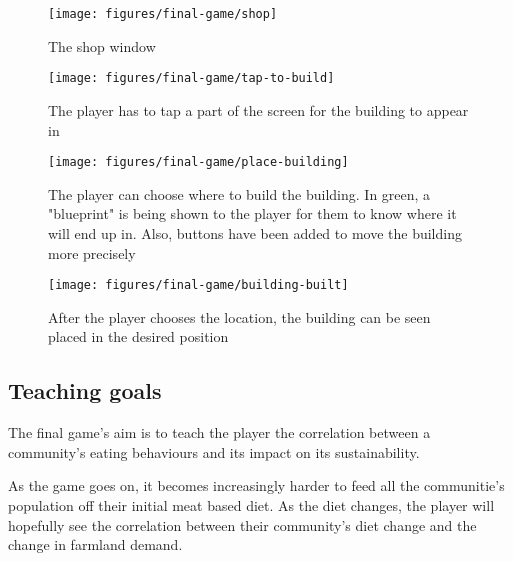 \begin{figure}
    \centering
    \texttt{[image: figures/final-game/shop]}
    \caption{The shop window}
    \label{fig:building-shop}
\end{figure}

\begin{figure}
    \centering
    \texttt{[image: figures/final-game/tap-to-build]}
    \caption{The player has to tap a part of the screen for the building to
		appear in}
    \label{fig:tap-to-build}
\end{figure}

\begin{figure}
    \centering
    \texttt{[image: figures/final-game/place-building]}
    \caption{The player can choose where to build the building. In green,
		a "blueprint" is being shown to the player for them to know
		where it will end up in. Also, buttons have been added
		to move the building more precisely}
    \label{fig:place-building}
\end{figure}

\begin{figure}
    \centering
    \texttt{[image: figures/final-game/building-built]}
    \caption{After the player chooses the location, the building can be seen
		placed in the desired position}
    \label{fig:building-built}
\end{figure}

\subsection{Teaching goals}

The final game's aim is to teach the player the correlation between a
community's eating behaviours and its impact on its sustainability.

As the game goes on, it becomes increasingly harder to feed all
the communitie's population off their initial meat based diet. As
the diet changes, the player will hopefully see the correlation between
their community's diet change and the change in farmland demand.
